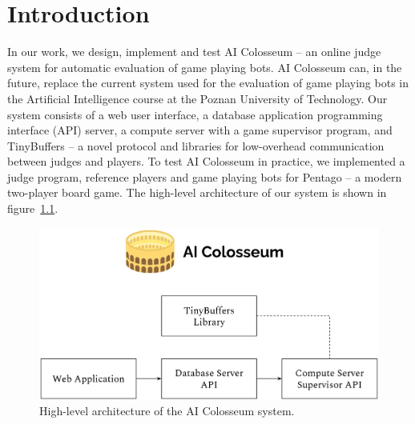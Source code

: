 \newcommand{\tw}[1]{\texttt{#1}} %
\newcommand{\tname}[1]{#1} %

\chapter{Introduction} %
\label{chap:intro}
 

In our work, we design, implement and test AI Colosseum -- an online judge system for automatic evaluation of game playing bots. AI Colosseum can, in the future, replace the current system used for the evaluation of game playing bots in the Artificial Intelligence course at the Poznan University of Technology. Our system consists of a web user interface, a database application programming interface (API) server, a compute server with a game supervisor program, and TinyBuffers -- a novel protocol and libraries for low-overhead communication between judges and players. To test AI Colosseum in practice, we implemented a judge program, reference players and game playing bots for Pentago -- a modern two-player board game. The high-level architecture of our system is shown in figure~\ref{fig:general_architecture}.

\begin{figure}[t]
    \centering\includegraphics[width=\textwidth]{figures/arch.png}
    \caption{High-level architecture of the AI Colosseum system.}\label{fig:general_architecture}
\end{figure}

